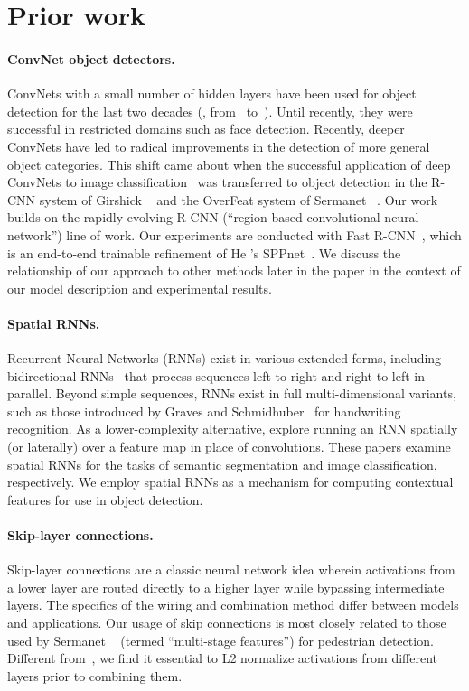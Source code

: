 \documentclass[10pt,twocolumn,letterpaper]{article}
\begin{document}
\section{Prior work}\paragraph{ConvNet object detectors.}
ConvNets with a small number of hidden layers have been used for object
detection for the last two decades (\eg, from~\cite{lecun94} to~\cite{sermanetCVPR13}).  Until
recently, they were successful in restricted domains such as face detection.
Recently, deeper ConvNets have led to radical improvements in the
detection of more general object categories.  This shift came about when the
successful application of deep ConvNets to image
classification~\cite{krizhevsky2012imagenet} was transferred to object detection
in the R-CNN system of Girshick \etal~\cite{girshick2014rcnn} and the OverFeat
system of Sermanet \etal~\cite{overfeat}.  Our work builds on the rapidly
evolving R-CNN (``region-based convolutional neural network'') line of work.
Our experiments are conducted with Fast R-CNN~\cite{fast-rcnn},
which is an end-to-end trainable refinement of He \etal's SPPnet~\cite{sppnet}.
We discuss the relationship of our approach to other methods later in the paper
in the context of our model description and experimental results.

\vspace{-3pt}\paragraph{Spatial RNNs.}
Recurrent Neural Networks (RNNs) exist in various extended forms, including
bidirectional RNNs~\cite{bi-rnn} that process sequences left-to-right and
right-to-left in parallel.  Beyond simple sequences, RNNs exist in full
multi-dimensional variants, such as those introduced by Graves and
Schmidhuber~\cite{nd-rnn} for handwriting recognition.  As a lower-complexity
alternative, \cite{sceneLSTM,renet} explore running an RNN spatially (or
laterally) over a feature map in place of convolutions. These papers examine
spatial RNNs for the tasks of semantic segmentation and image classification,
respectively.  We employ spatial RNNs as a mechanism for computing contextual
features for use in object detection.

\vspace{-3pt}\paragraph{Skip-layer connections.}
Skip-layer connections are a classic neural network idea wherein activations
from a lower layer are routed directly to a higher layer while bypassing intermediate layers.  The specifics of the wiring and combination method
differ between models and applications.  Our usage of skip connections is most
closely related to those used by Sermanet \etal~\cite{sermanetCVPR13} (termed
``multi-stage features'') for pedestrian detection.  Different
from~\cite{sermanetCVPR13}, we find it essential to L2 normalize activations
from different layers prior to combining them.
\end{document}

